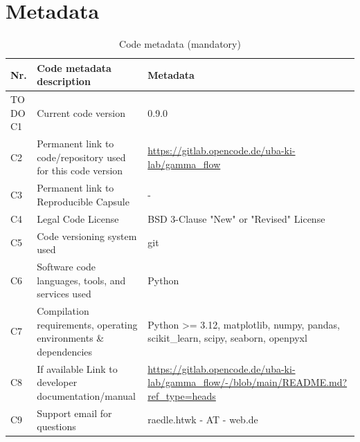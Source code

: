 \documentclass[preprint, 12pt, a4paper]{elsarticle}
\begin{document}

\section*{Metadata}


\begin{table}[!ht]
\begin{tabular}{|l|p{6.5cm}|p{6.5cm}|}
\hline
\textbf{Nr.} & \textbf{Code metadata description} & \textbf{Metadata} \\
\hline
TO DO C1 & Current code version & 0.9.0 \\
\hline
C2 & Permanent link to code/repository used for this code version & \url{https://gitlab.opencode.de/uba-ki-lab/gamma_flow} \\
\hline
C3  & Permanent link to Reproducible Capsule & - \\
\hline
C4 & Legal Code License & BSD 3-Clause "New" or "Revised" License \\
\hline
C5 & Code versioning system used & git\\
\hline
C6 & Software code languages, tools, and services used & Python \\
\hline
C7 & Compilation requirements, operating environments \& dependencies & Python >= 3.12, matplotlib, numpy, pandas, scikit\_learn, scipy, seaborn, openpyxl \\
\hline
C8 & If available Link to developer documentation/manual & \url{https://gitlab.opencode.de/uba-ki-lab/gamma_flow/-/blob/main/README.md?ref_type=heads} \\
\hline
C9 & Support email for questions & raedle.htwk - AT - web.de\\
\hline
\end{tabular}
\caption{Code metadata (mandatory)}
\label{codeMetadata} 
\end{table}
\end{document}
